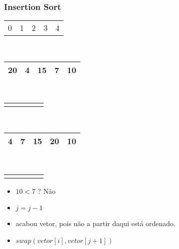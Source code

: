 \documentclass{beamer}
\begin{document}
\begin{frame}
    \frametitle{Insertion Sort}
    \begin{center}
        \begin{table}
            \begin{tabular}{p{0.25cm} p{0.25cm} p{0.25cm} p{0.25cm} p{0.25cm}}
                0 & 1 & 2 & 3 & 4
            \end{tabular} \\
            \begin{tabular}{| p{0.25cm} | p{0.25cm} | p{0.25cm} | p{0.25cm} | p{0.25cm} |}
                \hline
                20 & 4 & 15 & 7 & 10 \\ \hline
            \end{tabular} \\
            \begin{tabular}{p{0.25cm} p{0.25cm} p{0.25cm} p{0.25cm} p{0.25cm}}
                & & & & \color{blue}{$\updownarrow$}
            \end{tabular} \\
            \begin{tabular}{| p{0.25cm} | p{0.25cm} | p{0.25cm} | p{0.25cm} | p{0.25cm} |}
                \hline
                4 & 7 & 15 & 20 & 10 \\ \hline
            \end{tabular} \\
            \begin{tabular}{p{0.25cm} p{0.25cm} p{0.25cm} p{0.25cm} p{0.25cm}}
                & \color{red}{$\uparrow$} & & & \color{blue}{$\uparrow$}
            \end{tabular}
        \end{table}
	\end{center}
    \begin{itemize}[<+->]
        \item $10 < 7$ ? Não
        \item $j = j - 1$
        \item acabou vetor, pois não a partir daqui está ordenado.
        \item $swap(vetor[i], vetor[j + 1])$
    \end{itemize}
\end{frame}
\end{document}
